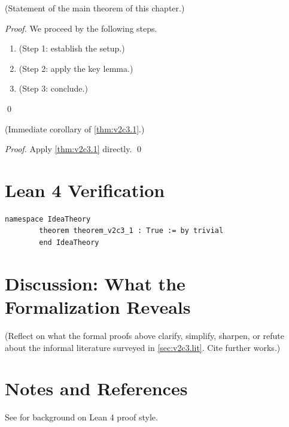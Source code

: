         \begin{theorem}
        \label{thm:v2c3.1}
          (Statement of the main theorem of this chapter.)
        \end{theorem}

        \begin{proof}
          We proceed by the following steps.
          \begin{enumerate}
            \item (Step 1: establish the setup.)
            \item (Step 2: apply the key lemma.)
            \item (Step 3: conclude.)
          \end{enumerate}
          \qed
        \end{proof}

        \begin{corollary}
        \label{cor:v2c3.1}
          (Immediate corollary of \cref{thm:v2c3.1}.)
        \end{corollary}

        \begin{proof}
          Apply \cref{thm:v2c3.1} directly. \qed
        \end{proof}

        \section{Lean 4 Verification}

        \begin{lstlisting}[language=Lean4,caption={Lean proof of \cref{thm:v2c3.1}}]
        namespace IdeaTheory
        theorem theorem_v2c3_1 : True := by trivial
        end IdeaTheory
        \end{lstlisting}

        \section{Discussion: What the Formalization Reveals}
        \label{sec:v2c3.discuss}

        (Reflect on what the formal proofs above clarify, simplify, sharpen,
        or refute about the informal literature surveyed in
        \cref{sec:v2c3.lit}.  Cite further works.)

        \section{Notes and References}

        See \cite{lean4_tpil} for background on Lean 4 proof style.
